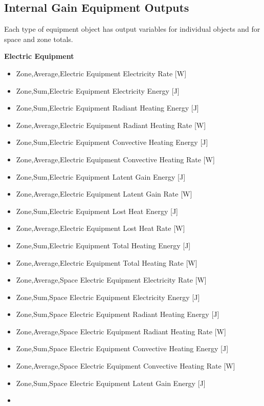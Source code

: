 \subsection{Internal Gain Equipment Outputs}\label{outputs-5-004}

Each type of equipment object has output variables for individual objects and for space and zone totals.

\textbf{Electric Equipment}

\begin{itemize}
\item
  Zone,Average,Electric Equipment Electricity Rate {[}W{]}
\item
  Zone,Sum,Electric Equipment Electricity Energy {[}J{]}
\item
  Zone,Sum,Electric Equipment Radiant Heating Energy {[}J{]}
\item
  Zone,Average,Electric Equipment Radiant Heating Rate {[}W{]}
\item
  Zone,Sum,Electric Equipment Convective Heating Energy {[}J{]}
\item
  Zone,Average,Electric Equipment Convective Heating Rate {[}W{]}
\item
  Zone,Sum,Electric Equipment Latent Gain Energy {[}J{]}
\item
  Zone,Average,Electric Equipment Latent Gain Rate {[}W{]}
\item
  Zone,Sum,Electric Equipment Lost Heat Energy {[}J{]}
\item
  Zone,Average,Electric Equipment Lost Heat Rate {[}W{]}
\item
  Zone,Sum,Electric Equipment Total Heating Energy {[}J{]}
\item
  Zone,Average,Electric Equipment Total Heating Rate {[}W{]}
\item
  Zone,Average,Space Electric Equipment Electricity Rate {[}W{]}
\item
  Zone,Sum,Space Electric Equipment Electricity Energy {[}J{]}
\item
  Zone,Sum,Space Electric Equipment Radiant Heating Energy {[}J{]}
\item
  Zone,Average,Space Electric Equipment Radiant Heating Rate {[}W{]}
\item
  Zone,Sum,Space Electric Equipment Convective Heating Energy {[}J{]}
\item
  Zone,Average,Space Electric Equipment Convective Heating Rate {[}W{]}
\item
  Zone,Sum,Space Electric Equipment Latent Gain Energy {[}J{]}
\item

\end{itemize}
